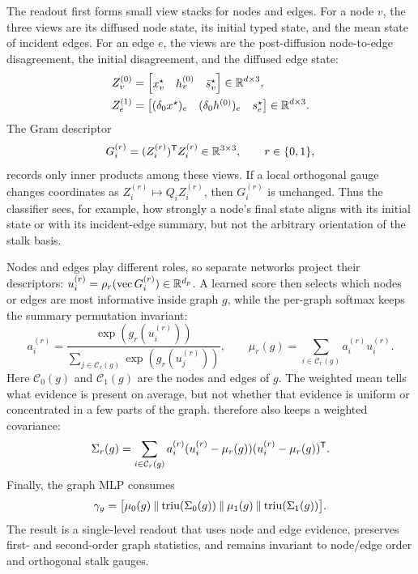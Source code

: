 The readout first forms small view stacks for nodes and edges.  For a node \(v\), the three views
are its diffused node state, its initial typed state, and the mean state of incident edges.  For an
edge \(e\), the views are the post-diffusion node-to-edge disagreement, the initial disagreement,
and the diffused edge state:
\begin{equation}
  \begin{aligned}
  Z_v^{(0)}
  &=\begin{bmatrix}x_v^\star&h_v^{(0)}&\bar s_v^\star\end{bmatrix}
    \in\mathbb{R}^{d\times3},\\
  Z_e^{(1)}
  &=\begin{bmatrix}
    (\delta_0x^\star)_e&(\delta_0h^{(0)})_e&s_e^\star
  \end{bmatrix}
    \in\mathbb{R}^{d\times3}.
  \end{aligned}
\end{equation}
The Gram descriptor
\[
  G_i^{(r)}=(Z_i^{(r)})^{\mathsf{T}}Z_i^{(r)}\in\mathbb{R}^{3\times3},
  \qquad r\in\{0,1\},
\]
records only inner products among these views.  If a local orthogonal gauge changes coordinates as
\(Z_i^{(r)}\mapsto Q_iZ_i^{(r)}\), then \(G_i^{(r)}\) is unchanged.  Thus the classifier sees, for
example, how strongly a node's final state aligns with its initial state or with its incident-edge
summary, but not the arbitrary orientation of the stalk basis.

Nodes and edges play different roles, so separate networks project their descriptors:
\(u_i^{(r)}=\rho_r(\operatorname{vec}G_i^{(r)})\in\mathbb{R}^{d_p}\).  A learned score then selects which
nodes or edges are most informative inside graph \(g\), while the per-graph softmax keeps the
summary permutation invariant:
\begin{equation}
  a_i^{(r)}
  =\frac{\exp(g_r(u_i^{(r)}))}
         {\sum_{j\in\mathcal{C}_r(g)}\exp(g_r(u_j^{(r)}))},
  \qquad
  \mu_r(g)=\sum_{i\in\mathcal{C}_r(g)}a_i^{(r)}u_i^{(r)} .
\end{equation}
Here \(\mathcal{C}_0(g)\) and \(\mathcal{C}_1(g)\) are the nodes and edges of \(g\).  The weighted
mean tells what evidence is present on average, but not whether that evidence is uniform or
concentrated in a few parts of the graph.  \sheafcovpool{} therefore also keeps a weighted
covariance:
\begin{equation}
  \Sigma_r(g)
  =\sum_{i\in\mathcal{C}_r(g)}a_i^{(r)}
    (u_i^{(r)}-\mu_r(g))(u_i^{(r)}-\mu_r(g))^{\mathsf{T}}.
\end{equation}
Finally, the graph MLP consumes
\begin{equation}
  \gamma_g=
  \bigl[
  \mu_0(g)\mathbin\Vert\operatorname{triu}(\Sigma_0(g))
  \mathbin\Vert\mu_1(g)\mathbin\Vert\operatorname{triu}(\Sigma_1(g))
  \bigr].
\end{equation}
The result is a single-level readout that uses node and edge evidence, preserves first- and
second-order graph statistics, and remains invariant to node/edge order and orthogonal stalk gauges.

